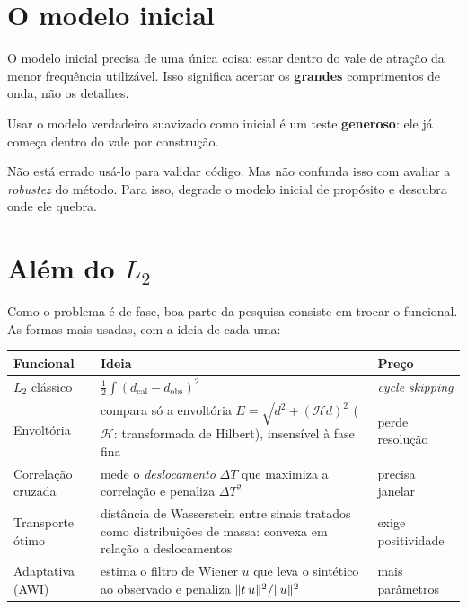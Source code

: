 \documentclass[11pt,a4paper,oneside]{report}
\begin{document}
\section{O modelo inicial}

O modelo inicial precisa de uma \'unica coisa: estar dentro do vale de
atra\c{c}\~ao da menor frequ\^encia utiliz\'avel. Isso significa acertar os
\textbf{grandes} comprimentos de onda, n\~ao os detalhes.

\begin{armadilha}
Usar o modelo verdadeiro suavizado como inicial \'e um teste
\textbf{generoso}: ele j\'a come\c{c}a dentro do vale por constru\c{c}\~ao.

N\~ao est\'a errado us\'a-lo para validar c\'odigo. Mas n\~ao confunda isso
com avaliar a \emph{robustez} do m\'etodo. Para isso, degrade o modelo inicial
de prop\'osito e descubra onde ele quebra.
\end{armadilha}

\section{Al\'em do $L_2$}

Como o problema \'e de fase, boa parte da pesquisa consiste em trocar o
funcional. As formas mais usadas, com a ideia de cada uma:

\begin{center}
\begin{tabular}{@{}lp{6.0cm}l@{}}
\toprule
\textbf{Funcional} & \textbf{Ideia} & \textbf{Pre\c{c}o} \\
\midrule
$L_2$ cl\'assico & $\tfrac12\int (d_{\text{cal}}-d_{\text{obs}})^{2}$
  & \emph{cycle skipping} \\
Envolt\'oria & \raggedright compara s\'o a envolt\'oria
  $E = \sqrt{d^{2} + (\mathcal{H}d)^{2}}$ ($\mathcal{H}$: transformada de
  Hilbert), insens\'ivel \`a fase fina & perde resolu\c{c}\~ao \\
Correla\c{c}\~ao cruzada & mede o \emph{deslocamento} $\Delta T$ que maximiza
  a correla\c{c}\~ao e penaliza $\Delta T^{2}$ & precisa janelar \\
Transporte \'otimo & dist\^ancia de Wasserstein entre sinais tratados como
  distribui\c{c}\~oes de massa: convexa em rela\c{c}\~ao a deslocamentos &
  exige positividade \\
Adaptativa (AWI) & estima o filtro de Wiener $u$ que leva o sint\'etico ao
  observado e penaliza $\lVert t\,u \rVert^{2}/\lVert u \rVert^{2}$ & mais par\^ametros \\
\bottomrule
\end{tabular}
\end{center}
\end{document}
